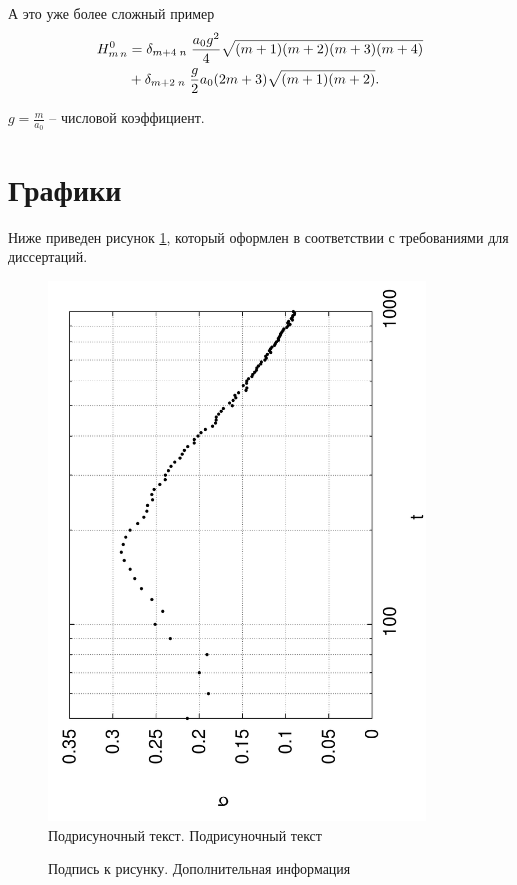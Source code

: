А это уже более сложный пример
\begin{align}
H^0_{m\, n} & = \delta_{m + 4 \; n} \;\frac{a_0 g^2}{4} \sqrt{(m + 1)(m + 2)(m +
3)(m +
4)} \notag\\
 & + \delta_{m + 2 \; n} \;\frac{g}{2} a_0  (2 m + 3) \sqrt{(m
+ 1)(m  + 2)}.\label{eq:Hmn}
\end{align}
\begin{eqrem}
$g = \frac{m}{a_0}$ -- числовой коэффициент.
\end{eqrem}


\section{Графики}

Ниже приведен рисунок \ref{fig}, который оформлен в соответствии с требованиями
для диссертаций.

\begin{figure}[h!]
\begin{center}
\includegraphics[angle=270,width=10cm]{test}\\[2mm]
{\small Подрисуночный текст. Подрисуночный текст}
\caption{Подпись к рисунку. Дополнительная информация}\label{fig}
\end{center}
\end{figure}

